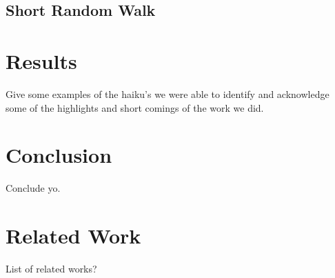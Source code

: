 \documentclass[]{article}
\begin{document}

\subsection{Short Random Walk}

\section{Results}
Give some examples of the haiku's we were able to identify and acknowledge some of the highlights and short comings of the work we did.

\section{Conclusion}
Conclude yo.

\section{Related Work}
List of related works?



\end{document}
